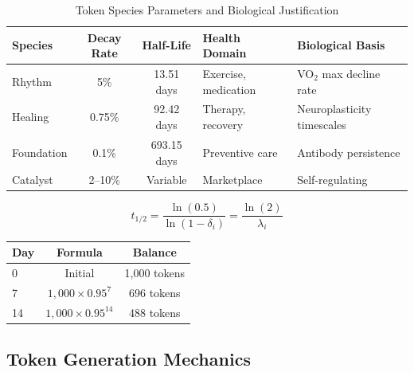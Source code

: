 \documentclass[11pt,letterpaper]{article}
\begin{document}
\begin{table}[H]
\centering
\caption{Token Species Parameters and Biological Justification}
\begin{tabular}{lccll}
\toprule
\textbf{Species} & \textbf{Decay Rate} & \textbf{Half-Life} & \textbf{Health Domain} & \textbf{Biological Basis} \\
\midrule
Rhythm & 5\% & 13.51 days & Exercise, medication & VO$_2$ max decline rate \cite{mujika2000detraining} \\
Healing & 0.75\% & 92.42 days & Therapy, recovery & Neuroplasticity timescales \cite{kolb2011neuroplasticity} \\
Foundation & 0.1\% & 693.15 days & Preventive care & Antibody persistence \cite{amanna2007duration} \\
Catalyst & 2--10\% & Variable & Marketplace & Self-regulating \\
\bottomrule
\end{tabular}
\end{table}

\clearpage
{}

\begin{equation}
t_{1/2} = \frac{\ln(0.5)}{\ln(1 - \delta_i)} = \frac{\ln(2)}{\lambda_i}
\end{equation}


\begin{table}[H]
\centering
\begin{tabular}{lcc}
\toprule
\textbf{Day} & \textbf{Formula} & \textbf{Balance} \\
\midrule
0 & Initial & 1,000 tokens \\
7 & $1,000 \times 0.95^7$ & 696 tokens \\
14 & $1,000 \times 0.95^{14}$ & 488 tokens \\
\bottomrule
\end{tabular}
\end{table}


\subsection{Token Generation Mechanics}
\end{document}
